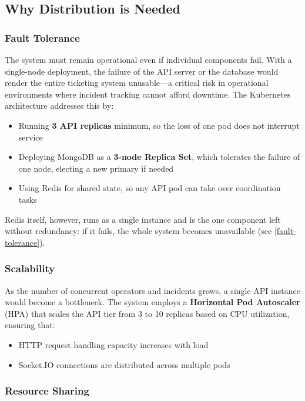 \documentclass{scrartcl}
\begin{document}
\subsection{Why Distribution is Needed}

\subsubsection{Fault Tolerance}

The system must remain operational even if individual components fail.
With a single-node deployment, the failure of the API server or the database would render the entire ticketing system unusable---a critical risk in operational environments where incident tracking cannot afford downtime.
The Kubernetes architecture addresses this by:
%
\begin{itemize}
    \item Running \textbf{3 API replicas} minimum, so the loss of one pod does not interrupt service
    \item Deploying MongoDB as a \textbf{3-node Replica Set}, which tolerates the failure of one node, electing a new primary if needed
    \item Using Redis for shared state, so any API pod can take over coordination tasks
\end{itemize}
%
Redis itself, however, runs as a single instance and is the one component left without redundancy: if it fails, the whole system becomes unavailable (see \cref{fault-tolerance}).

\subsubsection{Scalability}

As the number of concurrent operators and incidents grows, a single API instance would become a bottleneck.
The system employs a \textbf{Horizontal Pod Autoscaler} (HPA) that scales the API tier from 3 to 10 replicas based on CPU utilization, ensuring that:
%
\begin{itemize}
    \item HTTP request handling capacity increases with load
    \item Socket.IO connections are distributed across multiple pods
\end{itemize}

\subsubsection{Resource Sharing}
\end{document}
